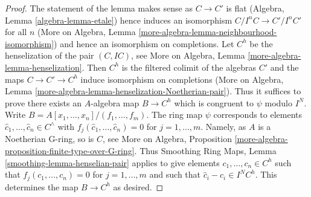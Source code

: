 \documentclass[10pt,a4paper]{amsart}
\theoremstyle{plain}
\theoremstyle{definition}
\theoremstyle{remark}
\numberwithin{equation}{subsection}
\begin{document}
\begin{proof}
The statement of the lemma makes sense as $C \to C'$ is flat
(Algebra, Lemma \ref{algebra-lemma-etale}) hence induces an isomorphism
$C/I^nC \to C'/I^nC'$ for all $n$
(More on Algebra, Lemma \ref{more-algebra-lemma-neighbourhood-isomorphism})
and hence an isomorphism on completions.
Let $C^h$ be the henselization of the pair $(C, IC)$, see
More on Algebra, Lemma \ref{more-algebra-lemma-henselization}.
Then $C^h$ is the filtered colimit of the algebras $C'$
and the maps
$C \to C' \to C^h$ induce isomorphism on completions (More on Algebra,
Lemma \ref{more-algebra-lemma-henselization-Noetherian-pair}).
Thus it suffices to prove there exists an $A$-algebra map
$B \to C^h$ which is congruent to $\psi$ modulo $I^N$.
Write $B = A[x_1, \ldots, x_n]/(f_1, \ldots, f_m)$.
The ring map $\psi$ corresponds to elements
$\hat c_1, \ldots, \hat c_n \in C^\wedge$ with
$f_j(\hat c_1, \ldots, \hat c_n) = 0$ for $j = 1, \ldots, m$.
Namely, as $A$ is a Noetherian G-ring, so is $C$, see
More on Algebra, Proposition
\ref{more-algebra-proposition-finite-type-over-G-ring}.
Thus Smoothing Ring Maps,
Lemma \ref{smoothing-lemma-henselian-pair}
applies to give elements $c_1, \ldots, c_n \in C^h$ such
that $f_j(c_1, \ldots, c_n) = 0$ for $j = 1, \ldots, m$
and such that $\hat c_i - c_i \in I^NC^h$.
This determines the map $B \to C^h$ as desired.
\end{proof}
\end{document}
